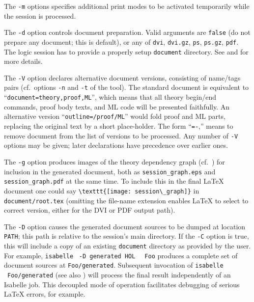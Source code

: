 \begin{isabellebody}
\begin{isamarkuptext}
  The \verb|-m| options specifies additional print modes to be
  activated temporarily while the session is processed.

  \medskip The \verb|-d| option controls document preparation.
  Valid arguments are \verb|false| (do not prepare any document;
  this is default), or any of \verb|dvi|, \verb|dvi.gz|,
  \verb|ps|, \verb|ps.gz|, \verb|pdf|.  The logic
  session has to provide a properly setup \verb|document|
  directory.  See  and
   for more details.

  \medskip The \verb|-V| option declares alternative document
  versions, consisting of name/tags pairs (cf.\ options \verb|-n| and \verb|-t| of the \hyperlink{tool.document}{\mbox{}} tool).  The
  standard document is equivalent to ``\verb|document=theory,proof,ML|'', which means that all theory begin/end
  commands, proof body texts, and ML code will be presented
  faithfully.  An alternative version ``\verb|outline=/proof/ML|'' would fold proof and ML parts, replacing the
  original text by a short place-holder.  The form ``\verb|=-|,'' means to remove document  from
  the list of versions to be processed.  Any number of \verb|-V| options may be given; later declarations have precedence over
  earlier ones.

  \medskip The \verb|-g| option produces images of the theory
  dependency graph (cf.\ ) for inclusion in the
  generated document, both as \verb|session_graph.eps| and
  \verb|session_graph.pdf| at the same time.  To include this in
  the final {\LaTeX} document one could say \verb|\texttt{[image: session\_graph]}| in \verb|document/root.tex| (omitting the file-name extension enables
  {\LaTeX} to select to correct version, either for the DVI or PDF
  output path).

  \medskip The \verb|-D| option causes the generated document
  sources to be dumped at location \verb|PATH|; this path is
  relative to the session's main directory.  If the \verb|-C|
  option is true, this will include a copy of an existing \verb|document| directory as provided by the user.  For example,
  \verb|isabelle| \hyperlink{tool.usedir}{\mbox{}}~\verb|-D generated HOL|\isasep\isanewline%
\verb|  Foo| produces a complete set of document sources at \verb|Foo/generated|.  Subsequent invocation of \verb|isabelle| \hyperlink{tool.document}{\mbox{}}~\verb|Foo/generated| (see also
  ) will process the final result
  independently of an Isabelle job.  This decoupled mode of operation
  facilitates debugging of serious {\LaTeX} errors, for example.


\end{isamarkuptext}
\end{isabellebody}
